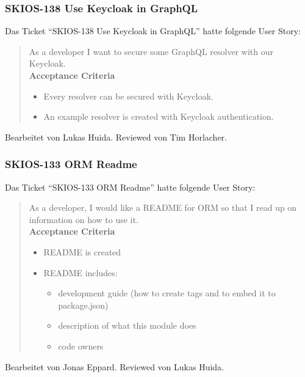 \subsubsection{SKIOS-138 Use Keycloak in GraphQL}
Das Ticket \enquote{SKIOS-138 Use Keycloak in GraphQL} hatte folgende User Story:
\begin{quotation}
    As a developer I want to secure some GraphQL resolver with our Keycloak. \\
    \textbf{Acceptance Criteria}
    \begin{itemize}
        \item Every resolver can be secured with Keycloak.
        \item An example resolver is created with Keycloak authentication.
    \end{itemize}
\end{quotation}
Bearbeitet von Lukas Huida.
Reviewed von Tim Horlacher.

\subsubsection{SKIOS-133 ORM Readme}
Das Ticket \enquote{SKIOS-133 ORM Readme} hatte folgende User Story:
\begin{quotation}
    As a developer, I would like a README for ORM so that I read up on information on how to use it. \\
\textbf{Acceptance Criteria}
\begin{itemize}
    \item README is created
    \item README includes:
    \begin{itemize}
        \item development guide (how to create tags and to embed it to package.json)
        \item description of what this module does
        \item code owners 
    \end{itemize}
\end{itemize}
\end{quotation}
Bearbeitet von Jonas Eppard.
Reviewed von Lukas Huida.

